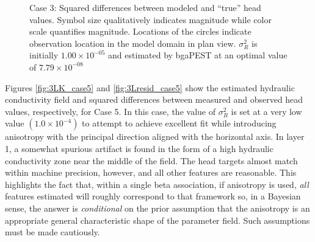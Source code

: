 \documentclass[11pt,oneside,onecolumn]{usgsreport}
\begin{document}
\begin{appendix}
\begin{figure}[!t]
\caption{\label{fig:3Lresid_case3}Case 3: Squared differences between modeled
and ``true'' head values. Symbol size qualitatively indicates magnitude
while color scale quantifies magnitude. Locations of the circles indicate
observation location in the model domain in plan view. $\sigma_{R}^{2}$ is initially $1.00\times10^{-05}$ and estimated by bgaPEST at an optimal value of $7.79\times10^{-08}$}
\end{figure}


Figures \ref{fig:3LK_case5} and \ref{fig:3Lresid_case5} show the
estimated hydraulic conductivity field and squared differences between
measured and observed head values, respectively, for Case 5. In this
case, the value of $\sigma_{R}^{2}$ is set at a very low value $\left(1.0\times10^{-4}\right)$
to attempt to achieve excellent fit while introducing anisotropy with
the principal direction aligned with the horizontal axis. In layer
1, a somewhat spurious artifact is found in the form of a high hydraulic
conductivity zone near the middle of the field. The head targets almost
match within machine precision, however, and all other features are
reasonable. This highlights the fact that, within a single beta association,
if anisotropy is used, \emph{all }features estimated will roughly
correspond to that framework so, in a Bayesian sense, the answer is
\emph{conditional }on the prior assumption that the anisotropy is
an appropriate general characteristic shape of the parameter field.
Such assumptions must be made cautiously.


\end{appendix}
\end{document}
